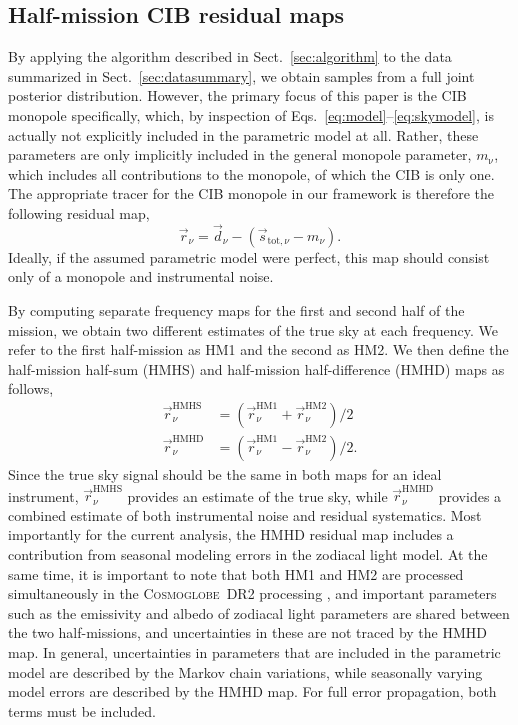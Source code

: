\documentclass{aa}
\newcommand{\dv}[0]{\vec{d}}
\newcommand{\s}[0]{\vec{s}}
\renewcommand{\r}[0]{\vec{r}}
\newcommand{\cosmoglobe}{\textsc{Cosmoglobe}}
\begin{document}
\subsection{Half-mission CIB residual maps}

By applying the algorithm described in Sect.~\ref{sec:algorithm} to the data
summarized in Sect.~\ref{sec:datasummary}, we obtain samples from a full joint
posterior distribution. However, the primary focus of this paper is the CIB
monopole specifically, which, by inspection of
Eqs.~\eqref{eq:model}--\eqref{eq:skymodel}, is actually not explicitly included
in the parametric model at all. Rather, these parameters are only implicitly
included in the general monopole parameter, $m_{\mathrm{\nu}}$, which includes
all contributions to the monopole, of which the CIB is only one. The
appropriate tracer for the CIB monopole in our framework is therefore the
following residual map,
\begin{equation}
\r_{\nu} = \dv_{\nu} - \left(\s_{\mathrm{tot},\nu} - m_{\nu}\right).
\end{equation}
Ideally, if the assumed parametric model were perfect, this map should
consist only of a monopole and instrumental noise.

By computing separate
frequency maps for the first and second half of the mission, we obtain
two different estimates of the true sky at each frequency. We
refer to the first half-mission as HM1 and the second as HM2. We then
define the half-mission half-sum (HMHS) and half-mission
half-difference (HMHD) maps as follows,
\begin{align}
\r_{\nu}^{\mathrm{HMHS}} &= (\r_{\nu}^{\mathrm{HM1}} + \r_{\nu}^{\mathrm{HM2}})/2\\
\r_{\nu}^{\mathrm{HMHD}} &= (\r_{\nu}^{\mathrm{HM1}} -
\r_{\nu}^{\mathrm{HM2}})/2.
\end{align}
Since the true sky signal should be the same in both maps for an ideal
instrument, $\r_{\nu}^{\mathrm{HMHS}}$ provides an estimate of the
true sky, while $\r_{\nu}^{\mathrm{HMHD}}$ provides a combined
estimate of both instrumental noise and residual systematics. Most
importantly for the current analysis, the HMHD residual map includes a
contribution from seasonal modeling errors in the zodiacal light
model. At the same time, it is important to note that both HM1 and HM2
are processed simultaneously in the \cosmoglobe\ DR2 processing
\citep{CG02_01}, and important parameters such as the emissivity and
albedo of zodiacal light parameters are shared between the two
half-missions, and uncertainties in these are not traced by the HMHD
map. In general, uncertainties in parameters that are included in the
parametric model are described by the Markov chain variations, while
seasonally varying model errors are described by the HMHD map. For
full error propagation, both terms must be included.
\end{document}

